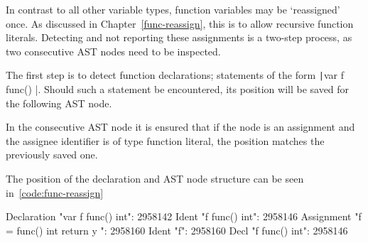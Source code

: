 In contrast to all other variable types, function variables may be `reassigned' once.
As discussed in Chapter~\ref{func-reassign}, this is to allow recursive function
literals. Detecting and not reporting these assignments is a two-step process, as two
consecutive AST nodes need to be inspected.

The first step is to detect function declarations; statements of the form
\texttt|var f func() |. Should such a statement be encountered,
its position will be saved for the following AST node.

In the consecutive AST node it is ensured that if the node is an assignment and
the assignee identifier is of type function literal, the position matches the
previously saved one.

The position of the declaration and AST node structure can be seen in~\ref{code:func-reassign}

\begin{code}
    \begin{gocode}
Declaration "var f func() int": 2958142
        Ident "f func() int": 2958146
Assignment "f = func() int { return y }": 2958160
        Ident "f": 2958160
                Decl "f func() int": 2958146
    \end{gocode}
    \label{code:func-reassign}
\end{code}
